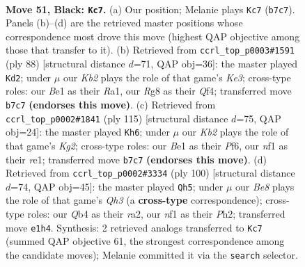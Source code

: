 \documentclass[11pt]{article}
\begin{document}
\clearpage

\begin{figure}[p]\centering
\begin{subfigure}{0.46\textwidth}\centering
\resizebox{\linewidth}{!}{%
\newchessgame
\chessboard[
  setfen={r5r1/pk4pQ/7p/3p3P/pq1P2P1/4P3/7K/4bN2 b - - 11 51},
  showmover=false,
  pgfstyle=straightmove, color=movearrow, markmove={b7-c7}
]}
\caption{}
\end{subfigure}\hfill
\begin{subfigure}{0.46\textwidth}\centering
\resizebox{\linewidth}{!}{%
\newchessgame
\chessboard[
  setfen={6k1/R1p3p1/2Pp4/3P3p/5Q1P/1r2K1Pq/8/R7 w - - 3 45},
  showmover=false,
  pgfstyle=straightmove, color=movearrow, markmove={e3-d2}
]}
\caption{}
\end{subfigure}
\\[4pt]
\begin{subfigure}{0.46\textwidth}\centering
\resizebox{\linewidth}{!}{%
\newchessgame
\chessboard[
  setfen={2Q5/p2r2k1/1p3p2/5q1p/8/1P5P/P5P1/4R2K b - - 49 58},
  showmover=false,
  pgfstyle=straightmove, color=movearrow, markmove={g7-h6}
]}
\caption{}
\end{subfigure}\hfill
\begin{subfigure}{0.46\textwidth}\centering
\resizebox{\linewidth}{!}{%
\newchessgame
\chessboard[
  setfen={8/3k4/pp2p3/3p4/3P2P1/1P1q1P1Q/r6P/5RK1 w - - 0 51},
  showmover=false,
  pgfstyle=straightmove, color=movearrow, markmove={h3-h5}
]}
\caption{}
\end{subfigure}
\caption{\textbf{Move 51, Black: \texttt{Kc7}.} (a) Our position; Melanie plays \texttt{Kc7} (\texttt{b7c7}). Panels (b)--(d) are the retrieved master positions whose correspondence most drove this move (highest QAP objective among those that transfer to it). (b) Retrieved from \texttt{ccrl\_top\_p0003\#1591} (ply 88) [structural distance $d$=71, QAP obj=36]: the master played \texttt{Kd2}; under $\mu$ our \emph{Kb2} plays the role of that game's \emph{Ke3}; cross-type roles: our \emph{B}e1 as their \emph{R}a1, our \emph{R}g8 as their \emph{Q}f4; transferred move \texttt{b7c7} \textbf{(endorses this move)}. (c) Retrieved from \texttt{ccrl\_top\_p0002\#1841} (ply 115) [structural distance $d$=75, QAP obj=24]: the master played \texttt{Kh6}; under $\mu$ our \emph{Kb2} plays the role of that game's \emph{Kg2}; cross-type roles: our \emph{B}e1 as their \emph{P}f6, our \emph{n}f1 as their \emph{r}e1; transferred move \texttt{b7c7} \textbf{(endorses this move)}. (d) Retrieved from \texttt{ccrl\_top\_p0002\#3334} (ply 100) [structural distance $d$=74, QAP obj=45]: the master played \texttt{Qh5}; under $\mu$ our \emph{Be8} plays the role of that game's \emph{Qh3} (a \textbf{cross-type} correspondence); cross-type roles: our \emph{Q}b4 as their \emph{r}a2, our \emph{n}f1 as their \emph{P}h2; transferred move \texttt{e1h4}. Synthesis: 2 retrieved analogs transferred to \texttt{Kc7} (summed QAP objective 61, the strongest correspondence among the candidate moves); Melanie committed it via the \texttt{search} selector.}
\label{fig:thought-m101}
\end{figure}
\end{document}

